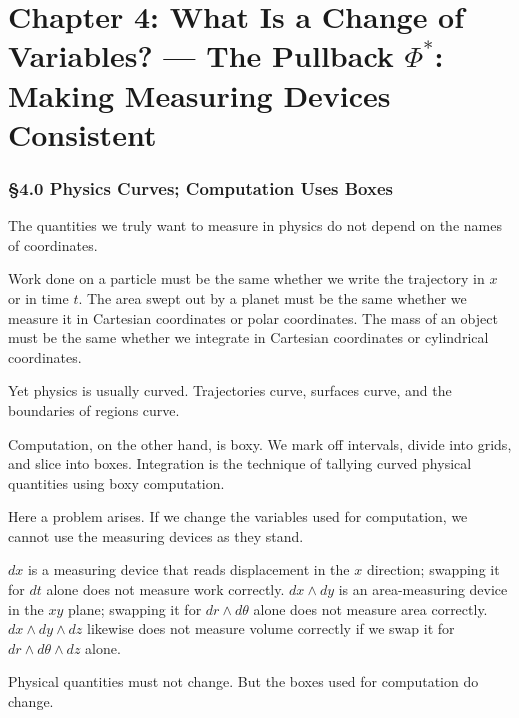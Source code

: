 \newpage

\hypertarget{chapter-4-what-is-a-change-of-variables-the-pullback-phi-making-measuring-devices-consistent}{%
\chapter{\texorpdfstring{Chapter 4: What Is a Change of Variables? ---
The Pullback \(\Phi^*\): Making Measuring Devices
Consistent}{Chapter 4: What Is a Change of Variables? --- The Pullback \textbackslash Phi\^{}*: Making Measuring Devices Consistent}}\label{chapter-4-what-is-a-change-of-variables-the-pullback-phi-making-measuring-devices-consistent}}

\hypertarget{physics-curves-computation-uses-boxes}{%
\subsection{§4.0 Physics Curves; Computation Uses
Boxes}\label{physics-curves-computation-uses-boxes}}

The quantities we truly want to measure in physics do not depend on the
names of coordinates.

Work done on a particle must be the same whether we write the trajectory
in \(x\) or in time \(t\). The area swept out by a planet must be the
same whether we measure it in Cartesian coordinates or polar
coordinates. The mass of an object must be the same whether we integrate
in Cartesian coordinates or cylindrical coordinates.

Yet physics is usually curved. Trajectories curve, surfaces curve, and
the boundaries of regions curve.

Computation, on the other hand, is boxy. We mark off intervals, divide
into grids, and slice into boxes. Integration is the technique of
tallying curved physical quantities using boxy computation.

Here a problem arises. If we change the variables used for computation,
we cannot use the measuring devices as they stand.

\(dx\) is a measuring device that reads displacement in the \(x\)
direction; swapping it for \(dt\) alone does not measure work correctly.
\(dx \wedge dy\) is an area-measuring device in the \(xy\) plane;
swapping it for \(dr \wedge d\theta\) alone does not measure area
correctly. \(dx \wedge dy \wedge dz\) likewise does not measure volume
correctly if we swap it for \(dr \wedge d\theta \wedge dz\) alone.

Physical quantities must not change. But the boxes used for computation
do change.

